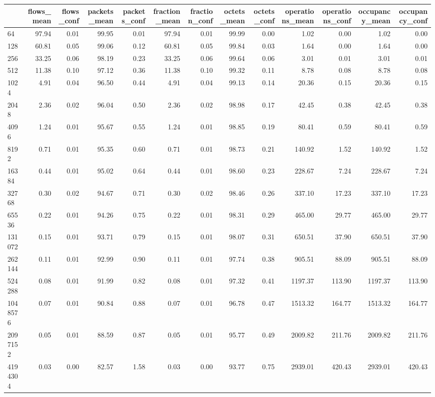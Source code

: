 \begin{tabular}{lrrrrrrrrrrrr}
\toprule
 & flows_mean & flows_conf & packets_mean & packets_conf & fraction_mean & fraction_conf & octets_mean & octets_conf & operations_mean & operations_conf & occupancy_mean & occupancy_conf \\
\midrule
64 & 97.94 & 0.01 & 99.95 & 0.01 & 97.94 & 0.01 & 99.99 & 0.00 & 1.02 & 0.00 & 1.02 & 0.00 \\
128 & 60.81 & 0.05 & 99.06 & 0.12 & 60.81 & 0.05 & 99.84 & 0.03 & 1.64 & 0.00 & 1.64 & 0.00 \\
256 & 33.25 & 0.06 & 98.19 & 0.23 & 33.25 & 0.06 & 99.64 & 0.06 & 3.01 & 0.01 & 3.01 & 0.01 \\
512 & 11.38 & 0.10 & 97.12 & 0.36 & 11.38 & 0.10 & 99.32 & 0.11 & 8.78 & 0.08 & 8.78 & 0.08 \\
1024 & 4.91 & 0.04 & 96.50 & 0.44 & 4.91 & 0.04 & 99.13 & 0.14 & 20.36 & 0.15 & 20.36 & 0.15 \\
2048 & 2.36 & 0.02 & 96.04 & 0.50 & 2.36 & 0.02 & 98.98 & 0.17 & 42.45 & 0.38 & 42.45 & 0.38 \\
4096 & 1.24 & 0.01 & 95.67 & 0.55 & 1.24 & 0.01 & 98.85 & 0.19 & 80.41 & 0.59 & 80.41 & 0.59 \\
8192 & 0.71 & 0.01 & 95.35 & 0.60 & 0.71 & 0.01 & 98.73 & 0.21 & 140.92 & 1.52 & 140.92 & 1.52 \\
16384 & 0.44 & 0.01 & 95.02 & 0.64 & 0.44 & 0.01 & 98.60 & 0.23 & 228.67 & 7.24 & 228.67 & 7.24 \\
32768 & 0.30 & 0.02 & 94.67 & 0.71 & 0.30 & 0.02 & 98.46 & 0.26 & 337.10 & 17.23 & 337.10 & 17.23 \\
65536 & 0.22 & 0.01 & 94.26 & 0.75 & 0.22 & 0.01 & 98.31 & 0.29 & 465.00 & 29.77 & 465.00 & 29.77 \\
131072 & 0.15 & 0.01 & 93.71 & 0.79 & 0.15 & 0.01 & 98.07 & 0.31 & 650.51 & 37.90 & 650.51 & 37.90 \\
262144 & 0.11 & 0.01 & 92.99 & 0.90 & 0.11 & 0.01 & 97.74 & 0.38 & 905.51 & 88.09 & 905.51 & 88.09 \\
524288 & 0.08 & 0.01 & 91.99 & 0.82 & 0.08 & 0.01 & 97.32 & 0.41 & 1197.37 & 113.90 & 1197.37 & 113.90 \\
1048576 & 0.07 & 0.01 & 90.84 & 0.88 & 0.07 & 0.01 & 96.78 & 0.47 & 1513.32 & 164.77 & 1513.32 & 164.77 \\
2097152 & 0.05 & 0.01 & 88.59 & 0.87 & 0.05 & 0.01 & 95.77 & 0.49 & 2009.82 & 211.76 & 2009.82 & 211.76 \\
4194304 & 0.03 & 0.00 & 82.57 & 1.58 & 0.03 & 0.00 & 93.77 & 0.75 & 2939.01 & 420.43 & 2939.01 & 420.43 \\

\end{tabular}
